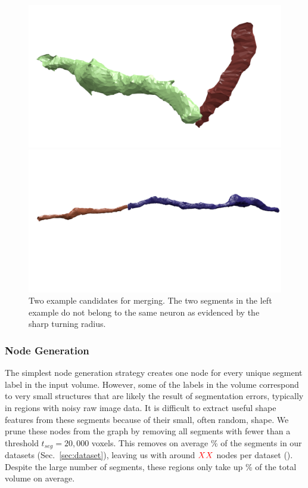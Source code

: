 \begin{figure}[t]
	\begin{minipage}{0.45\linewidth}
		\includegraphics[width=\linewidth]{./figures/constraint_error.png}
	\end{minipage}
	\hfill
	\begin{minipage}{0.45\linewidth}
		\includegraphics[width=\linewidth]{./figures/constraint_success.png}
	\end{minipage}
	\caption{Two example candidates for merging. The two segments in the left example do not belong to the same neuron as evidenced by the sharp turning radius.}
	\label{fig:turn-radii}
\end{figure}

\subsubsection{Node Generation}

The simplest node generation strategy creates one node for every unique segment label in the input volume. 
However, some of the labels in the volume correspond to very small structures that are likely the result of segmentation errors, typically in regions with noisy raw image data. 
It is difficult to extract useful shape features from these segments because of their small, often random, shape. 
We prune these nodes from the graph by removing all segments with fewer than a threshold $t_{seg} = 20,000$ voxels. 
This removes on average \% of the segments in our  datasets (Sec.~\ref{sec:dataset}), leaving us with around $\textcolor{red}{XX}$ nodes per dataset (). 
Despite the large number of segments, these regions only take up \% of the total volume on average.

